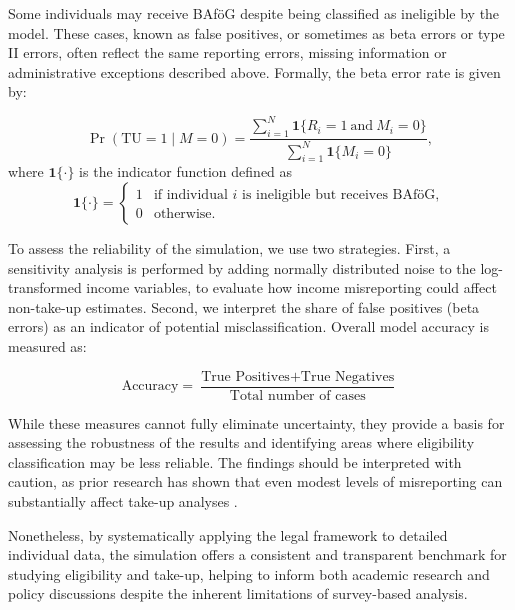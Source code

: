 Some individuals may receive BAföG despite being classified as ineligible by the model. These cases, known as false positives, or sometimes as beta errors or type II errors, often reflect the same reporting errors, missing information or administrative exceptions described above. Formally, the beta error rate is given by:

\begin{equation}
\Pr(\text{TU} = 1 \mid M = 0) = \frac{\sum_{i=1}^{N} \mathbf{1}\{R_i = 1 \ \text{and} \ M_i = 0\}}{\sum_{i=1}^{N} \mathbf{1}\{M_i = 0\}},
\end{equation}
where \( \mathbf{1}\{\cdot\} \) is the indicator function defined as
\[
\mathbf{1}\{\cdot\} =
\begin{cases}
1 & \text{if individual } i \text{ is ineligible but receives BAföG}, \\
0 & \text{otherwise}.
\end{cases}
\]

To assess the reliability of the simulation, we use two strategies. First, a sensitivity analysis is performed by adding normally distributed noise to the log-transformed income variables, to evaluate how income misreporting could affect non-take-up estimates. Second, we interpret the share of false positives (beta errors) as an indicator of potential misclassification. Overall model accuracy is measured as:

\begin{equation} \label{eq:accuracy_microsimulation}
	\text{Accuracy} = \frac{\text{True Positives} + \text{True Negatives}}{\text{Total number of cases}}
\end{equation}

While these measures cannot fully eliminate uncertainty, they provide a basis for assessing the robustness of the results and identifying areas where eligibility classification may be less reliable. The findings should be interpreted with caution, as prior research has shown that even modest levels of misreporting can substantially affect take-up analyses \citep{pudney_impact_2001}. 

Nonetheless, by systematically applying the legal framework to detailed individual data, the simulation offers a consistent and transparent benchmark for studying eligibility and take-up, helping to inform both academic research and policy discussions despite the inherent limitations of survey-based analysis.




